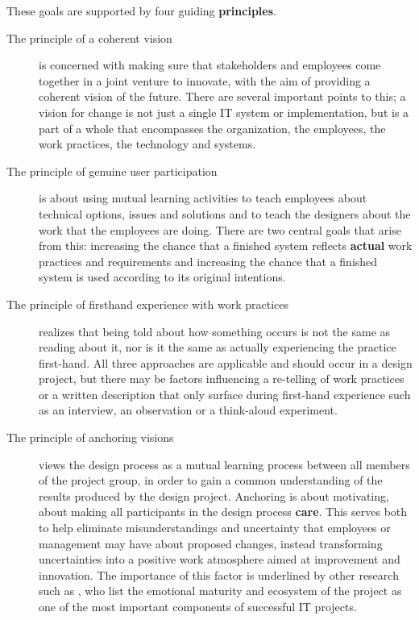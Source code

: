 These goals are supported by four guiding \textbf{principles}.
\begin{description}
    \item [The principle of a coherent vision] is concerned with making sure that stakeholders
        and employees come together in a joint venture to innovate, with the aim
        of providing a coherent vision of the future. There are several
        important points to this; a vision for change is not just a single IT
        system or implementation, but is a part of a whole that encompasses the
        organization, the employees, the work practices, the technology and
        systems. 
    \item [The principle of genuine user participation] is about using mutual learning activities
        to teach employees about technical options, issues and solutions and to
        teach the designers about the work that the employees are doing. There are
        two central goals that arise from this: increasing the chance that a
        finished system reflects \textbf{actual} work practices and
        requirements and increasing the chance that a finished system is used
        according to its original intentions.
    \item [The principle of firsthand experience with work practices] realizes that being told
        about how something occurs is not the same as reading about it, nor is
        it the same as actually experiencing the practice first-hand. All three
        approaches are applicable and should occur in a design project, but
        there may be factors influencing a re-telling of work practices or a
        written description that only surface during first-hand experience such
        as an interview, an observation or a think-aloud experiment.
    \item [The principle of anchoring visions] views the design process as a mutual learning
        process between all members of the project group, in order to gain a
        common understanding of the results produced by the design
        project\cite{bodker2004participatory}. Anchoring is about motivating,
        about making all participants in the design process \textbf{care}. This
        serves both to help eliminate misunderstandings and uncertainty
        that employees or management may have about proposed changes, instead
        transforming uncertainties into a positive work atmosphere aimed at
        improvement and innovation. The importance of this factor is underlined
        by other research such as \cite{standish20012}, who list the emotional
        maturity and ecosystem of the project as one of the most important
        components of successful IT projects.
\end{description}

